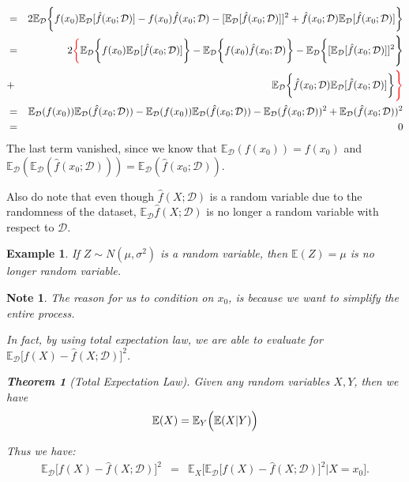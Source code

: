 \documentclass{article}
\theoremstyle{MyNonumberplain}
\theoremstyle{break}
\newcommand{\ev}{\mathbb{E}}
\newcommand{\evd}{\ev_{\mathcal{D}}}
\theoremstyle{break}
\newtheorem{theorem}{Theorem}[section]
\newtheorem{example}{Example}[section]
\newtheorem{note}{Note}
\begin{document}
\begin{thmbox}
    \begin{prfbox}
        \begin{eqnarray*}
            &=& 2 \evd \biggl\{f(x_0)\evd[\hat{f}(x_0;\mathcal{D})]-f(x_0)\hat{f}(x_0;\mathcal{D})-[\evd[\hat{f}(x_0;\mathcal{D})]]^2+\hat{f}(x_0;\mathcal{D})\evd[\hat{f}(x_0;\mathcal{D})]\biggr\} \\
            &=& 2  \textcolor{red}{\biggl\{}\evd\biggl\{f(x_0)\evd[\hat{f}(x_0;\mathcal{D})]\biggr\}-\evd\biggl\{f(x_0)\hat{f}(x_0;\mathcal{D})\biggr\}-\evd\biggl\{[\evd[\hat{f}(x_0;\mathcal{D})]]^2\Biggr\} \\
            &+& \evd\biggl\{\hat{f}(x_0;\mathcal{D})\evd[\hat{f}(x_0;\mathcal{D})]\biggr\}\textcolor{red}{\Biggr\}}\\
            &=& \evd(f(x_0))\evd(\hat{f}(x_0;\mathcal{D}))-\evd(f(x_0))\evd(\hat{f}(x_0;\mathcal{D}))-\evd(\hat{f}(x_0;\mathcal{D}))^2+\evd(\hat{f}(x_0;\mathcal{D}))^2\\
            &=& 0
        \end{eqnarray*}
        The last term vanished, since we know that $\evd(f(x_0))=f(x_0)$ and $\evd(\evd(\hat{f}(x_0;\mathcal{D}))) = \evd(\hat{f}(x_0;\mathcal{D})).$

        \bigskip
        Also do note that even though $\hat{f}(X;\mathcal{D})$ is a random variable due to the randomness of the dataset, $\evd\hat{f}(X;\mathcal{D})$ is 
        no longer a random variable with respect to $\mathcal{D}$.

        \begin{expbox}
            \begin{example}
                If $Z\sim N(\mu,\sigma^2)$ is a random variable, then $\ev(Z)=\mu$ is no longer random variable.
            \end{example}
        \end{expbox}

    \end{prfbox}
\end{thmbox}
\begin{notebox}
    \begin{note}
        The reason for us to condition on $x_0$, is because we want to simplify the entire process.

        In fact, by using total expectation law, we are able to evaluate for $\evd\bigl[f(X)-\hat{f}(X;\mathcal{D})\bigr]^2$.

        \begin{thmbox}
            \begin{theorem}[Total Expectation Law]
                Given any random variables $X,Y$, then we have 
                $$\ev(X)=\ev_Y\Bigl(\ev(X|Y)\Bigr)$$ 
            \end{theorem}
        \end{thmbox}
        Thus we have: 
        \begin{eqnarray*}
            \evd\bigl[f(X)-\hat{f}(X;\mathcal{D})\bigr]^2 &=& \ev_X\biggl[\evd\bigl[f(X)-\hat{f}(X;\mathcal{D})\bigr]^2|X=x_0\biggr].
        \end{eqnarray*}
    \end{note}
\end{notebox}
\end{document}
